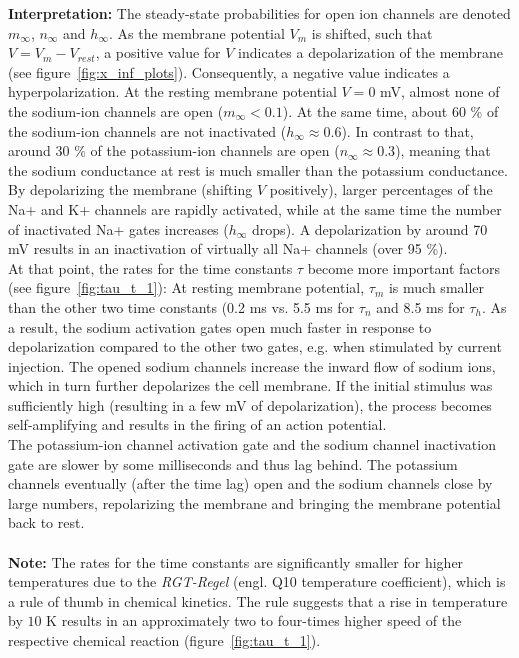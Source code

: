 \documentclass[
a4paper, 
12pt, 
]{article}
\begin{document}
	\textbf{Interpretation: }The steady-state probabilities for open ion channels are denoted $m_{\infty}$, $n_{\infty}$ and $h_{\infty}$. As the membrane potential $V_m$ is shifted, such that $V = V_m - V_{rest}$, a positive value for $V$ indicates a depolarization of the membrane (see figure~\ref{fig:x_inf_plots}). Consequently, a negative value indicates a hyperpolarization. At the resting membrane potential $V = 0$ mV, almost none of the sodium-ion channels are open ($m_{\infty}<0.1$). At the same time, about 60 \% of the sodium-ion channels are not inactivated ($h_{\infty} \approx 0.6$). In contrast to that, around 30 \% of the potassium-ion channels are open ($n_{\infty} \approx 0.3$), meaning that the sodium conductance at rest is much smaller than the potassium conductance. By depolarizing the membrane (shifting $V$ positively), larger percentages of the Na+ and K+ channels are rapidly activated, while at the same time the number of inactivated Na+ gates increases ($h_{\infty}$ drops). A depolarization by around 70 mV results in an inactivation of virtually all Na+ channels (over 95 \%).\\
	At that point, the rates for the time constants $\tau$ become more important factors (see figure~\ref{fig:tau_t_1}): At resting membrane potential, $\tau_m$ is much smaller than the other two time constants (0.2 ms vs. 5.5 ms for $\tau_n$ and 8.5 ms for $\tau_h$. As a result, the sodium activation gates open much faster in response to depolarization compared to the other two gates, e.g. when stimulated by current injection. The opened sodium channels increase the inward flow of sodium ions, which in turn further depolarizes the cell membrane. If the initial stimulus was sufficiently high (resulting in a few mV of depolarization), the process becomes self-amplifying and results in the firing of an action potential.\\
	The potassium-ion channel activation gate and the sodium channel inactivation gate are slower by some milliseconds and thus lag behind. The potassium channels eventually (after the time lag) open and the sodium channels close by large numbers, repolarizing the membrane and bringing the membrane potential back to rest.\\\\
	
	
	\textbf{Note: }The rates for the time constants are significantly smaller for higher temperatures due to the \textit{RGT-Regel} (engl. Q10 temperature coefficient), which is a rule of thumb in chemical kinetics. The rule suggests that a rise in temperature by $10$ K results in an approximately two to four-times higher speed of the respective chemical reaction (figure~\ref{fig:tau_t_1}). \\
	
\end{document}
